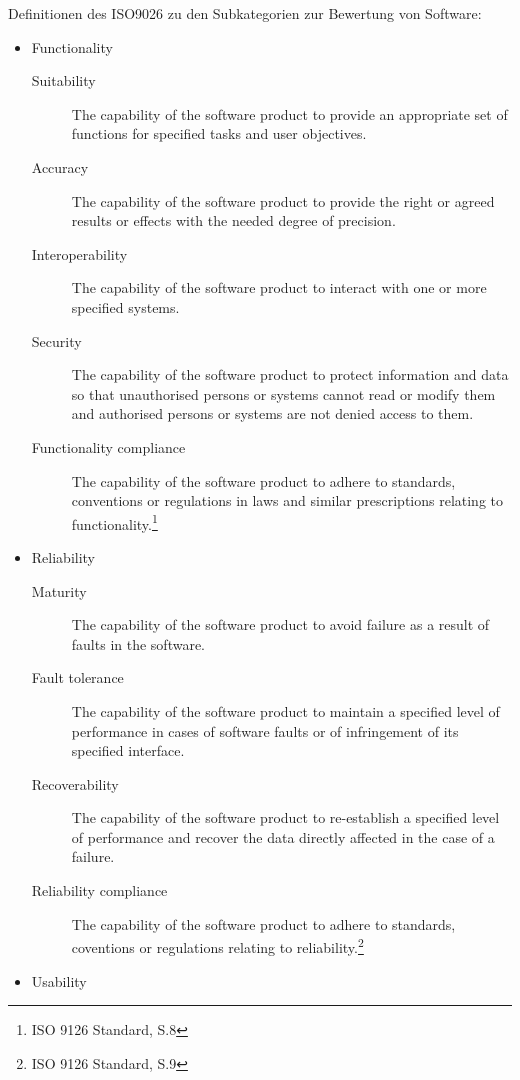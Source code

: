     Definitionen des ISO9026 zu den Subkategorien zur Bewertung von Software:
    \begin{itemize}
      \item Functionality
        \begin{description}
              \item[Suitability] The capability of the software product to provide an appropriate set of functions for specified tasks and user objectives.
              \item[Accuracy] The capability of the software product to provide the right or agreed results or effects with the needed degree of precision.
              \item[Interoperability] The capability of the software product to interact with one or more specified systems.
              \item[Security] The capability of the software product to protect information and data so that unauthorised persons or systems cannot read or modify them and authorised persons or systems are not denied access to them.
              \item[Functionality compliance] The capability of the software product to adhere to standards, conventions or regulations in laws and similar prescriptions relating to functionality.\footnote{ISO 9126 Standard, S.8}
            \end{description}
      \item Reliability
         \begin{description}
              \item[Maturity] The capability of the software product to avoid failure as a result of faults in the software.
              \item[Fault tolerance] The capability of the software product to maintain a specified level of performance in cases of software faults or of infringement of its specified interface.
              \item[Recoverability] The capability of the software product to re-establish a specified level of performance and recover the data directly affected in the case of a failure.
              \item[Reliability compliance] The capability of the software product to adhere to standards, coventions or regulations relating to reliability.\footnote{ISO 9126 Standard, S.9}
            \end{description}
      \item Usability
        \begin{description}

\end{description}
\end{itemize}
